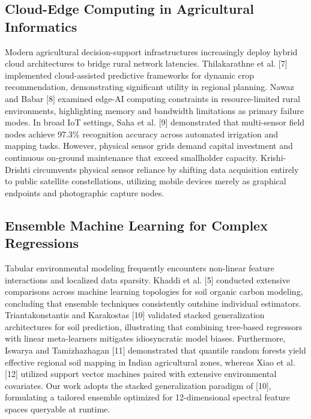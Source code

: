 \documentclass[10pt,a4paper,twocolumn]{IEEEtran}
\begin{document}
\subsection{Cloud-Edge Computing in Agricultural Informatics}
Modern agricultural decision-support infrastructures increasingly deploy hybrid cloud architectures to bridge rural network latencies. Thilakarathne et al. [7] implemented cloud-assisted predictive frameworks for dynamic crop recommendation, demonstrating significant utility in regional planning. Nawaz and Babar [8] examined edge-AI computing constraints in resource-limited rural environments, highlighting memory and bandwidth limitations as primary failure modes. In broad IoT settings, Saha et al. [9] demonstrated that multi-sensor field nodes achieve 97.3\% recognition accuracy across automated irrigation and mapping tasks. However, physical sensor grids demand capital investment and continuous on-ground maintenance that exceed smallholder capacity. Krishi-Drishti circumvents physical sensor reliance by shifting data acquisition entirely to public satellite constellations, utilizing mobile devices merely as graphical endpoints and photographic capture nodes.

\subsection{Ensemble Machine Learning for Complex Regressions}
Tabular environmental modeling frequently encounters non-linear feature interactions and localized data sparsity. Khaddi et al. [5] conducted extensive comparisons across machine learning topologies for soil organic carbon modeling, concluding that ensemble techniques consistently outshine individual estimators. Triantakonstantis and Karakostas [10] validated stacked generalization architectures for soil prediction, illustrating that combining tree-based regressors with linear meta-learners mitigates idiosyncratic model biases. Furthermore, Iswarya and Tamizhazhagan [11] demonstrated that quantile random forests yield effective regional soil mapping in Indian agricultural zones, whereas Xiao et al. [12] utilized support vector machines paired with extensive environmental covariates. Our work adopts the stacked generalization paradigm of [10], formulating a tailored ensemble optimized for 12-dimensional spectral feature spaces queryable at runtime.
\end{document}

